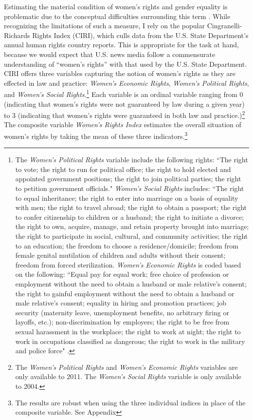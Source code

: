 \documentclass[11pt, oneside]{article}
\begin{document}
Estimating the material condition of women's rights and gender equality is problematic due to the conceptual difficulties surrounding this term \cite{peksen2011}. While recognizing the limitations of such a measure, I rely on the popular Cingranelli-Richards Rights Index (CIRI), which culls data from the U.S. State Department's annual human rights country reports. This is appropriate for the task at hand, because we would expect that U.S. news media follow a commensurate understanding of ``women's rights'' with that used by the U.S. State Department. CIRI offers three variables capturing the notion of women's rights as they are effected in law and practice: \emph{Women's Economic Rights}, \emph{Women's Political Rights}, and \emph{Women's Social Rights}.\footnote{\hspace{5}The \emph{Women's Political Rights} variable include the following rights: ``The right to vote; the right to run for political office; the right to hold elected and appointed government positions; the right to join political parties; the right to petition government officials." \emph{Women's Social Rights} includes: ``The right to equal inheritance; the right to enter into marriage on a basis of equality with men; the right to travel abroad; the right to obtain a passport; the right to confer citizenship to children or a husband; the right to initiate a divorce; the right to own, acquire, manage, and retain property brought into marriage; the right to participate in social, cultural, and community activities; the right to an education; the freedom to choose a residence/domicile; freedom from female genital mutilation of children and adults without their consent; freedom from forced sterilization. \emph{Women's Economic Rights} is coded based on the following: ``Equal pay for equal work; free choice of profession or employment without the need to obtain a husband or male relative's consent; the right to gainful employment without the need to obtain a husband or male relative's consent; equality in hiring and promotion practices; job security (maternity leave, unemployment benefits, no arbitrary firing or layoffs, etc.); non-discrimination by employers; the right to be free from sexual harassment in the workplace; the right to work at night; the right to work in occupations classified as dangerous; the right to work in the military and police force"  \cite{cingranelli2012}.}  Each variable is an ordinal variable ranging from 0 (indicating that women's rights were not guaranteed by law during a given year) to 3 (indicating that women's rights were guaranteed in both law and practice.)\footnote{\hspace{5}The \emph{Women's Political Rights} and \emph{Women's Economic Rights} variables are only available to 2011. The \emph{Women's Social Rights} variable is only available to 2004.} The composite variable \emph{Women's Rights Index} estimates the overall situation of women's rights by taking the mean of these three indicators.\footnote{\hspace{3} The results are robust when using the three individual indices in place of the composite variable. See Appendix}  
\end{document}
